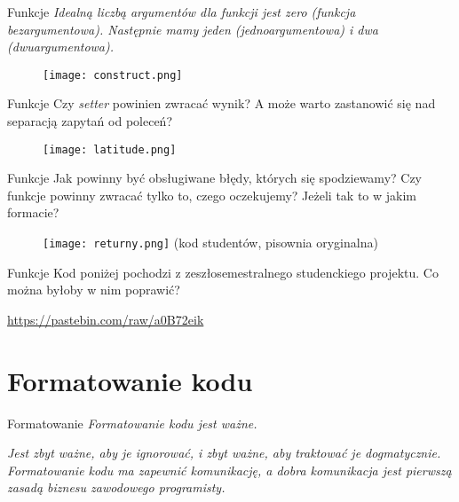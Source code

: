 \begin{frame}{Funkcje}
	\emph{Idealną liczbą argumentów dla funkcji jest zero (funkcja bezargumentowa). Następnie mamy jeden (jednoargumentowa) i dwa (dwuargumentowa).}
\end{frame}

\begin{frame}
	\begin{figure} \centering
		\texttt{[image: construct.png]}
	\end{figure}
\end{frame}

\begin{frame}{Funkcje}
	Czy \emph{setter} powinien zwracać wynik? A może warto zastanowić się nad separacją zapytań od poleceń?
\end{frame}

\begin{frame}
	\begin{figure} \centering
		\texttt{[image: latitude.png]}
	\end{figure}
\end{frame}

\begin{frame}{Funkcje}
	Jak powinny być obsługiwane błędy, których się spodziewamy? Czy funkcje powinny zwracać tylko to, czego oczekujemy? Jeżeli tak to w jakim formacie?
\end{frame}

\begin{frame}
	\begin{figure} \centering
		\texttt{[image: returny.png]}
		\footnotesize{(kod studentów, pisownia oryginalna)}
	\end{figure}
\end{frame}

\begin{frame}{Funkcje}
	Kod poniżej pochodzi z zeszłosemestralnego studenckiego projektu. Co można byłoby w nim poprawić?
	
	\url{https://pastebin.com/raw/a0B72eik}
\end{frame}

\section{Formatowanie kodu}

\begin{frame}{Formatowanie}
	\emph{Formatowanie kodu jest ważne.}
	
	\emph{Jest zbyt ważne, aby je ignorować, i zbyt ważne, aby traktować je dogmatycznie. Formatowanie kodu ma zapewnić komunikację, a dobra komunikacja jest pierwszą zasadą biznesu zawodowego programisty.}
\end{frame}

